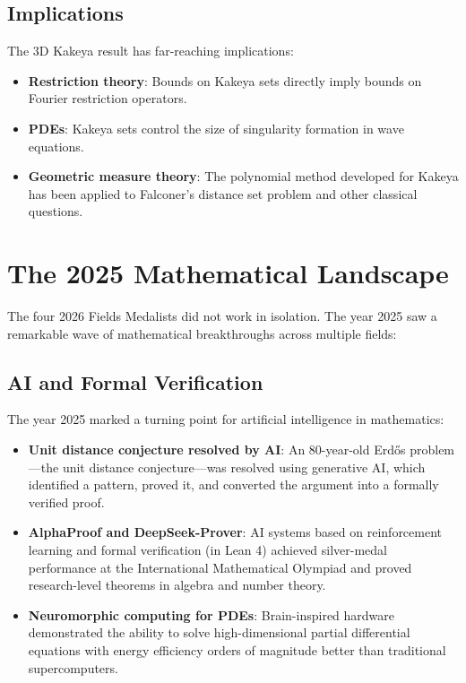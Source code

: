 \subsection{Implications}
The 3D Kakeya result has far-reaching implications:
\begin{itemize}
\item \textbf{Restriction theory}: Bounds on Kakeya sets directly imply bounds on Fourier restriction operators.
\item \textbf{PDEs}: Kakeya sets control the size of singularity formation in wave equations.
\item \textbf{Geometric measure theory}: The polynomial method developed for Kakeya has been applied to Falconer's distance set problem and other classical questions.
\end{itemize}

\section{The 2025 Mathematical Landscape}

The four 2026 Fields Medalists did not work in isolation. The year 2025 saw a remarkable wave of mathematical breakthroughs across multiple fields:

\subsection{AI and Formal Verification}
The year 2025 marked a turning point for artificial intelligence in mathematics:
\begin{itemize}
\item \textbf{Unit distance conjecture resolved by AI}: An 80-year-old Erd\H{o}s problem---the unit distance conjecture---was resolved using generative AI, which identified a pattern, proved it, and converted the argument into a formally verified proof.
\item \textbf{AlphaProof and DeepSeek-Prover}: AI systems based on reinforcement learning and formal verification (in Lean 4) achieved silver-medal performance at the International Mathematical Olympiad and proved research-level theorems in algebra and number theory.
\item \textbf{Neuromorphic computing for PDEs}: Brain-inspired hardware demonstrated the ability to solve high-dimensional partial differential equations with energy efficiency orders of magnitude better than traditional supercomputers.
\end{itemize}

